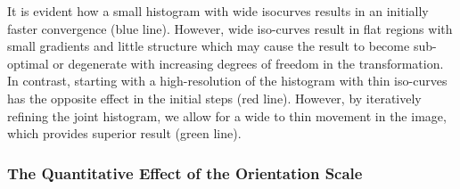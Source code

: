 \documentclass[twocolumn]{svjour3}
\begin{document}
It is evident how a small histogram with wide isocurves results in an initially faster
convergence  (blue line). However, wide iso-curves result in flat
regions with small gradients and little structure which may cause the result to become
sub-optimal or degenerate with increasing degrees of freedom in the transformation. In
contrast, starting with a high-resolution of the histogram with thin iso-curves has the
opposite effect in the initial steps (red line). However, by iteratively refining the
joint histogram, we allow for a wide to thin movement in the image, which provides
superior result (green line).

\subsubsection{The Quantitative Effect of the Orientation Scale}
\label{subsec:orientationparam}
\end{document}
